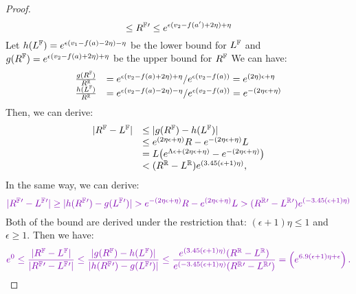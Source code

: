 \documentclass[a4paper,11pt]{article}
\begin{document}
\begin{proof}
{$$		\leq R^{\mathbb{F}}{'} \leq
		e^{\epsilon 
		(v_2 - f(a') + 2\eta) + \eta}$$
%
		Let  
		$h{(L^{\mathbb{F}}) } = e^{\epsilon 
		 (v_1 - f(a) - 2\eta) - \eta}$ 
		 be the lower bound for $L^{\mathbb{F}}$
		and $g(R^{\mathbb{F}}) = e^{\epsilon 
		(v_2 - f(a) + 2\eta) + \eta}$ 
		be the upper bound for $R^{\mathbb{F}}$
		We can have:
		\[
		\begin{array}{ll}
		\frac{g(\fvalR)}{\rvarR} 
		& = e^{\epsilon 
		(\valv_2 - f(a) + 2\eta) + \eta}/e^{\epsilon(\valv_2 - f(a))}
		 =
		e^{ 
		(2\eta)\epsilon + \eta}
		\\
%
		\frac{h(\fvalL )}{\rvarR} 
		& = e^{\epsilon 
		(\valv_2 - f(a) - 2\eta) - \eta}/e^{\epsilon(\valv_2 - f(a))}
		 =
		e^{ 
		-(2\eta\epsilon + \eta)}
		\end{array}
		\]
		Then, we can derive:
		\[
		\begin{array}{ll}
		|R^{\mathbb{F}} - L^{\mathbb{F}}|
		& \leq |g(R^{\mathbb{F}} ) - h(L^{\mathbb{F}} )| \\
		& \leq e^{ 
		(2\eta \epsilon + \eta)}R - 
		e^{-(2\eta\epsilon + \eta)} L \\
		& = L \big(  e^{ \Lambda\epsilon + (2\eta \epsilon + \eta)} 
		- e^{-(2\eta \epsilon + \eta)} \big)\\
		& < (R^{\mathbb{R}} - L^{\mathbb{R}})
		e^{(3.45(\epsilon + 1) \eta )},
		\end{array}
		\]
		In the same way, we can derive:
		\[
		\extend{
		|\fvarR{'} - \fvalL{'}|
		\geq 
		|h(\fvalR{'} ) - g(\fvalL{'} )|
		 > e^{-(2\eta \epsilon + \eta)} R 
		 - e^{(2\eta \epsilon + \eta)} L
		> (\rvalR{'} - \rvalL{'})
		e^{(-3.45(\epsilon + 1) \eta)}
		}
		\]
		Both of the bound are derived under the restriction that: $(\epsilon + 1) \eta \leq 1$ and $\epsilon \geq 1$.
		Then we have:
		\[
		\extend{
		e^0 \leq 
		\frac{|\fvalR - \fvalL |}
		{|\fvalR{'} - \fvalL{'}|}
		\leq
		\frac{|g(\fvalR ) - h(\fvalL )|}
		{|h(\fvalR{'} ) - g(\fvalL{'} )|}
		\leq 
		\frac{e^{(3.45(\epsilon + 1) \eta )}(\rvalR - \rvalL) }
		{e^{(-3.45(\epsilon + 1) \eta)} (\rvalR{'} - \rvalL{'})}
		=
		\left(
		e^{6.9( \epsilon + 1) \eta + \epsilon}
		\right).
		}		
		\]
		}
%
\end{proof}




\newpage


\end{document}
